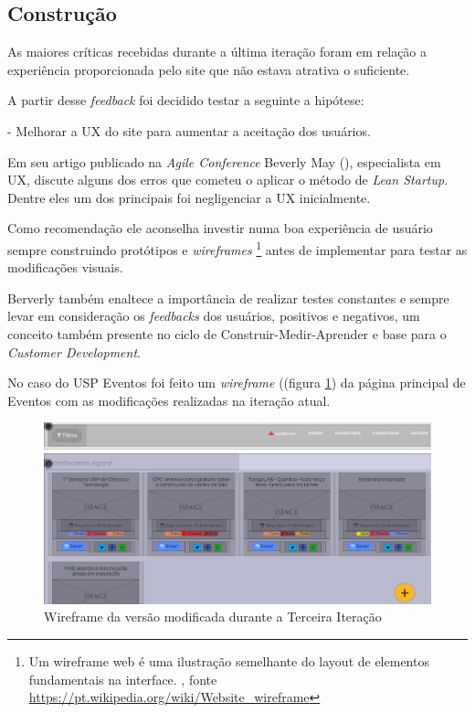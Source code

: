 \subsection{Construção}
	\par As maiores críticas recebidas durante a última iteração foram em relação a experiência proporcionada pelo site que não estava atrativa o suficiente.
	\par A partir desse \emph{feedback} foi decidido testar a seguinte a hipótese:
	\par - Melhorar a UX do site para aumentar a aceitação dos usuários.
	\par Em seu artigo publicado na \emph{Agile Conference} Beverly May (\cite{beverly:2012}), especialista em UX, discute alguns dos erros que cometeu o aplicar o método de \emph{Lean Startup}. Dentre eles um dos principais foi negligenciar a UX inicialmente.
	\par Como recomendação ele aconselha investir numa boa experiência de usuário sempre construindo protótipos e \emph{wireframes} \footnote{ Um wireframe web é uma ilustração semelhante do layout de elementos fundamentais na interface. , fonte \url{https://pt.wikipedia.org/wiki/Website_wireframe}} antes de implementar para testar as modificações visuais.
	 \par Berverly também enaltece a importância de realizar testes constantes e sempre levar em consideração os \emph{feedbacks} dos usuários, positivos e negativos, um conceito também presente no ciclo de Construir-Medir-Aprender e base para o \emph{Customer Development}.
	\par No caso do USP Eventos foi feito um \emph{wireframe} ((figura \ref{fig:wireframe}) da página principal de Eventos com as modificações realizadas na iteração atual.
\begin{figure}[htb]
\includegraphics[width=15cm]{figuras/wireframe}
\caption{\label{fig:wireframe} Wireframe da versão modificada durante a Terceira Iteração}
\end{figure}
